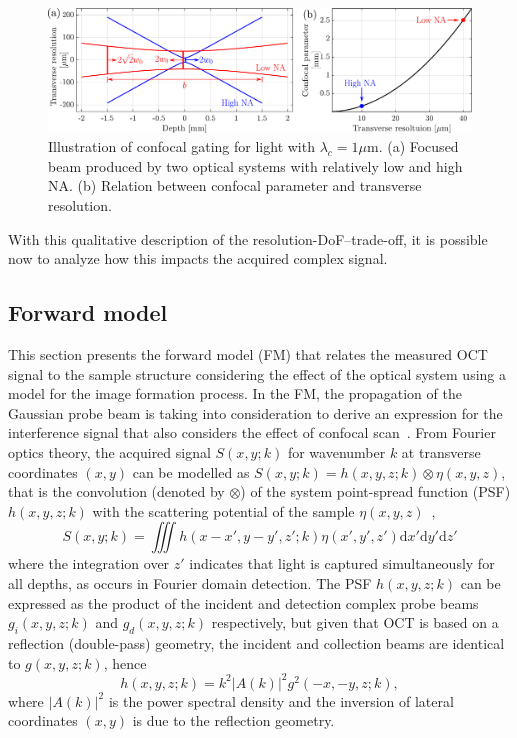 \begin{figure}[htb!]
    \centering
    \includegraphics[width=\textwidth]{Figures/TheoreticalBasis/ConfocalScan.pdf}
    \caption[Illustration of confocal gating.]{Illustration of confocal gating for light with $\lambda_c = 1\mu$m. (a) Focused beam produced by two optical systems with relatively low and high NA. (b) Relation between confocal parameter and transverse resolution.}
    \label{fig:ConfocalScan}
\end{figure}

With this qualitative description of the resolution-DoF--trade-off, it is possible now to analyze how this impacts the acquired complex signal.

\subsection{Forward model}

This section presents the forward model (FM) that relates the measured OCT signal to the sample structure considering the effect of the optical system using a model for the image formation process. In the FM, the propagation of the Gaussian probe beam is taking into consideration to derive an expression for the interference signal that also considers the effect of confocal scan~\cite{Ralston2006_Inverse, Ralston2006_NonParaxial}. From Fourier optics theory, the acquired signal $S(x,y; k)$ for wavenumber $k$ at transverse coordinates $(x,y)$ can be modelled as $S(x,y; k)= h(x,y,z; k)\otimes\eta(x,y,z)$, that is the convolution (denoted by $\otimes$) of the system point-spread function (PSF) $h(x,y,z; k)$ with the scattering potential of the sample $\eta(x,y,z)$~\cite{Davis2007_Nonparaxial},
\begin{equation}\label{eq:conv}
    S(x,y; k) = \iiint h(x-x', y-y', z'; k) \eta(x',y',z') \text{d}x' \text{d}y' \text{d}z'
\end{equation}
where the integration over $z'$ indicates that light is captured simultaneously for all depths, as occurs in Fourier domain detection. The PSF $h(x,y,z; k)$ can be expressed as the product of the incident and detection complex probe beams $g_i(x,y,z;k)$ and $g_d(x,y,z;k)$ respectively, but given that OCT is based on a reflection (double-pass) geometry, the incident and collection beams are identical to $g(x,y,z;k)$, hence~\cite{Ralston2006_Inverse}
\begin{equation}\label{eq:PSF1}
    h(x,y,z; k) =k^2|A(k)|^2g^2(-x, -y, z; k),
\end{equation}
where $|A(k)|^2$ is the power spectral density and the inversion of lateral coordinates $(x,y)$ is due to the reflection geometry.

